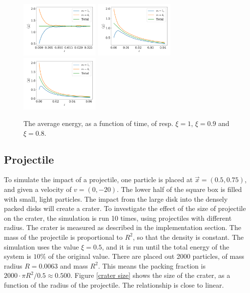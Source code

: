 \documentclass{article}
\begin{document}
            \begin{figure}
                \centering
                \hspace{-5mm}
                \includegraphics[width=0.35\textwidth]{../plots/problem3/xi_0/energy_ex3.pdf}
                \hspace{-4mm}
                \includegraphics[width=0.35\textwidth]{../plots/problem3/xi_1/energy_ex3.pdf}
                \hspace{-4mm}
                \includegraphics[width=0.35\textwidth]{../plots/problem3/xi_2/energy_ex3.pdf}
                \hspace{-5mm}
                \caption{The average energy, as a function of time, of resp. $\xi=1$, $\xi=0.9$ and $\xi=0.8$.}
                \label{problem2 dist}
            \end{figure}

            \subsection*{Projectile}
            To simulate the impact of a projectile, one particle is placed at $\vec x = (0.5, 0.75)$, and given a velocity of $v = (0, -20)$. The lower half of the square box is filled with small, light particles. The impact from the large disk into the densely packed disks will create a crater. To investigate the effect of the size of projectile on the crater, the simulation is run 10 times, using projectiles with different radius. The crater is measured as described in the implementation section. The mass of the projectile is proportional to $R^2$, so that the density is constant. The simulation uses the value $\xi = 0.5$, and it is run until the total energy of the system is $10\%$ of the original value. There are placed out 2000 particles, of mass radius $R=0.0063$ and mass $R^2$. This means the packing fraction is $2000 \cdot \pi R^2 / 0.5 \approx 0.500$. Figure \ref{crater size} shows the size of the crater, as a function of the radius of the projectile. The relationship is close to linear.
\end{document}
